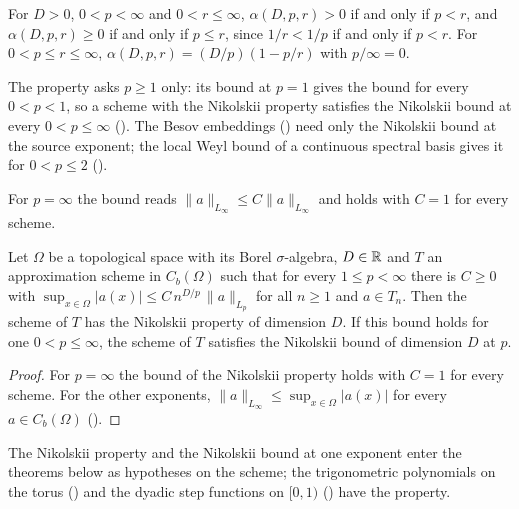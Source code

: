 For $D > 0$, $0 < p < \infty$ and $0 < r \leq \infty$, $\alpha(D, p, r) > 0$ if and only if $p < r$,
and $\alpha(D, p, r) \geq 0$ if and only if $p \leq r$, since $1/r < 1/p$ if and only if
$p < r$. For $0 < p \leq r \leq \infty$, $\alpha(D, p, r) = (D/p)(1 - p/r)$ with $p/\infty = 0$.

The property asks $p \geq 1$ only: its bound at $p = 1$ gives the bound for every
$0 < p < 1$, so a scheme with the Nikolskii property satisfies the Nikolskii bound at every
$0 < p \leq \infty$ (). The Besov embeddings
() need only the Nikolskii bound at the source exponent; the local
Weyl bound of a continuous spectral basis gives it for $0 < p \leq 2$
().

For $p = \infty$ the bound reads $\|a\|_{L_\infty} \leq C \|a\|_{L_\infty}$ and holds with
$C = 1$ for every scheme.

\begin{lemma}
\label{lem:continuous-scheme-sup-bound}
\leanok
{}
Let $\Omega$ be a topological space with its Borel $\sigma$-algebra, $D \in \mathbb{R}$ and $T$ an
approximation scheme in $C_b(\Omega)$ such that for every $1 \leq p < \infty$ there is
$C \geq 0$ with $\sup_{x \in \Omega} |a(x)| \leq C \, n^{D/p} \, \|a\|_{L_p}$ for all
$n \geq 1$ and $a \in T_n$. Then the scheme of $T$ has the Nikolskii property of dimension $D$.
If this bound holds for one $0 < p \leq \infty$, the scheme of $T$ satisfies the Nikolskii
bound of dimension $D$ at $p$.
\end{lemma}

\begin{proof}
\leanok
{}
For $p = \infty$ the bound of the Nikolskii property holds with $C = 1$ for every scheme. For
the other exponents, $\|a\|_{L_\infty} \leq \sup_{x \in \Omega} |a(x)|$ for every
$a \in C_b(\Omega)$ ().
\end{proof}

The Nikolskii property and the Nikolskii bound at one exponent enter the theorems below as
hypotheses on the scheme; the trigonometric polynomials on the torus ()
and the dyadic step functions on $[0, 1)$ () have the property.

